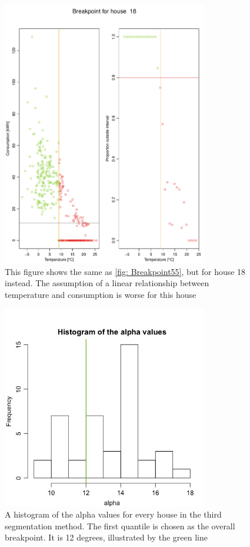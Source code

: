 \begin{figure}
    \centering
    \includegraphics[width=0.8\textwidth]{../../../figures/Breakpoint_18.pdf}
    \caption{This figure shows the same as \cref{fig: Breakpoint55}, but for house 18 instead. The assumption of a linear relationship between temperature and consumption is worse for this house}
    \label{fig: Breakpoint18}
\end{figure}
\begin{figure}
    \centering
    \includegraphics[width=0.8\textwidth]{../../../figures/AlphaHist.jpeg}
    \caption{A histogram of the alpha values for every house in the third segmentation method. The first quantile is chosen as the overall breakpoint. It is 12 degrees, illustrated by the green line}
    \label{fig: AlphaHist}
\end{figure}

